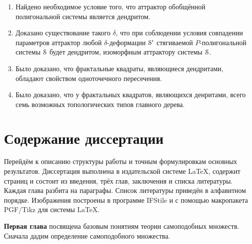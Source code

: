 \begin{enumerate}
\item Найдено необходимое условие того, что аттрактор обобщённой полигональной системы является дендритом.

\item Доказано существование такого $\delta$, что при соблюдении условия совпадении параметров аттрактор любой $\delta$-деформации ${\EuScript S}'$ стягиваемой $P$-полигональной системы ${\EuScript S}$ будет дендритом, изоморфным аттрактору системы ${\EuScript S}$.


\item Было доказано, что фрактальные квадраты, являющиеся дендритами, обладают свойством одноточечного пересечения.

\item Было доказано, что у фрактальных квадратов, являющихся денритами, всего семь возможных топологических типов главного дерева.
\end{enumerate}


\section{Содержание диссертации}


Перейдём к описанию структуры работы и точным формулировкам основных результатов.
Диссертация выполнена в издательской системе \LaTeX, содержит \red{\pageref{LastPage}} страниц и состоит из введения, трёх глав, заключения и списка литературы.
Каждая глава разбита на параграфы.
Список литературы приведён в алфавитном порядке.
Изображения построены в программе IFStile \cite{IFStile} и с помощью макропакета PGF/Tikz для системы \LaTeX.


\textbf{Первая глава} посвящена базовым понятиям теории самоподобных множеств.
Сначала дадим определение самоподобного множества. 


